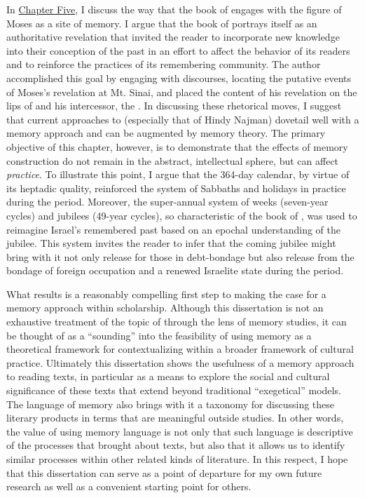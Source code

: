 In \hyperref[chap:jubilees]{Chapter Five}, I discuss the way that the book of \jub engages with the figure of Moses as a site of memory. I argue that the book of \jub portrays itself as an authoritative revelation that invited the reader to incorporate new knowledge into their conception of the past in an effort to affect the behavior of its readers and to reinforce the practices of its remembering community. The author accomplished this goal by engaging with \psgraphical discourses, locating the putative events of Moses's revelation at Mt. Sinai, and placed the content of his revelation on the lips of \yahweh and his intercessor, the \ap. In discussing these rhetorical moves, I suggest that current approaches to \jub (especially that of Hindy Najman) dovetail well with a memory approach and can be augmented by memory theory. The primary objective of this chapter, however, is to demonstrate that the effects of memory construction do not remain in the abstract, intellectual sphere, but can affect \emph{practice}. To illustrate this point, I argue that the 364-day calendar, by virtue of its heptadic quality, reinforced the system of Sabbaths and holidays in practice during the \secondtemple period. Moreover, the super-annual system of weeks (seven-year cycles) and jubilees (49-year cycles), so characteristic of the book of \jub, was used to reimagine Israel's remembered past based on an epochal understanding of the jubilee. This system invites the reader to infer that the coming jubilee might bring with it not only release for those in debt-bondage but also release from the bondage of foreign occupation and a renewed Israelite state during the \secondtemple period.

What results is a reasonably compelling first step to making the case for a memory approach within \rwb scholarship. Although this dissertation is not an exhaustive treatment of the topic of \rwb through the lens of memory studies, it can be thought of as a ``sounding'' into the feasibility of using memory as a theoretical framework for contextualizing \rwb within a broader framework of cultural practice. Ultimately this dissertation shows the usefulness of a memory approach to reading \rwb texts, in particular as a means to explore the social and cultural significance of these texts that extend beyond traditional ``exegetical'' models. The language of memory also brings with it a taxonomy for discussing these literary products in terms that are meaningful outside \secondtemple studies. In other words, the value of using memory language is not only that such language is descriptive of the processes that brought about \rwb texts, but also that it allows us to identify similar processes within other related kinds of literature. In this respect, I hope that this dissertation can serve as a point of departure for my own future research as well as a convenient starting point for others. 
